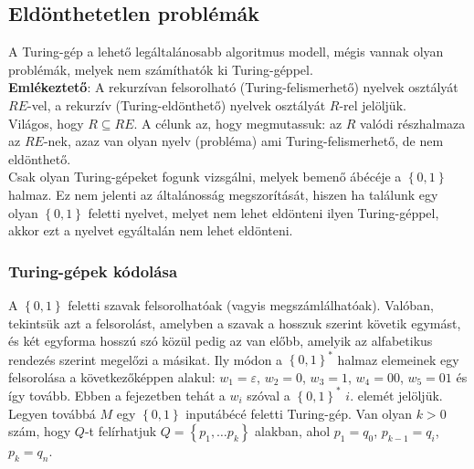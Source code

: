 \documentclass[tikz,12pt,margin=0px]{article}
\begin{document}
	\subsection*{Eldönthetetlen problémák}
	
	\noindent A Turing-gép a lehető legáltalánosabb algoritmus modell, mégis vannak olyan problémák, melyek nem számíthatók ki Turing-géppel.\\
	
	\noindent \textbf{Emlékeztető}: A rekurzívan felsorolható (Turing-felismerhető) nyelvek osztályát $RE$-vel,	a rekurzív (Turing-eldönthető) nyelvek osztályát $R$-rel jelöljük.\\
	
    \noindent Világos, hogy $R \subseteq RE $. A célunk az, hogy megmutassuk: az $R$ valódi részhalmaza az $RE$-nek, azaz van olyan nyelv (probléma) ami	Turing-felismerhető, de nem eldönthető.\\
	
    \noindent Csak olyan Turing-gépeket fogunk vizsgálni, melyek bemenő ábécéje a $\left\{0, 1\right\}$ halmaz. Ez nem jelenti az általánosság megszorítását, hiszen ha	találunk egy olyan $\left\{0, 1\right\}$ feletti nyelvet, melyet nem lehet eldönteni ilyen Turing-géppel, akkor ezt a nyelvet egyáltalán nem lehet eldönteni.\\
	
	\subsubsection*{Turing-gépek kódolása}
	
    A $\left\{0, 1\right\}$ feletti szavak felsorolhatóak (vagyis megszámlálhatóak). Valóban, tekintsük azt a felsorolást, amelyben a szavak a	hosszuk szerint követik egymást, és két egyforma hosszú szó közül pedig az van előbb, amelyik az alfabetikus rendezés szerint megelőzi a másikat. Ily módon a $\left\{0, 1\right\}^{*}$ halmaz elemeinek egy felsorolása a következőképpen alakul: $w_{1} = \varepsilon$, $w_{2} = 0$, $w_{3} = 1$, $w_{4} = 00$, $w_{5} = 01$ és így tovább. Ebben a fejezetben tehát a $w_{i}$ szóval a $\left\{0, 1\right\}^{*}$ $i$. elemét jelöljük.\\
	
    \noindent Legyen továbbá $M$ egy $\left\{0, 1\right\}$ inputábécé feletti Turing-gép. Van olyan $k > 0$ szám, hogy $Q$-t felírhatjuk $Q = \left\{p_{1}, \ldots p_{k}\right\}$ alakban, ahol $p_{1} = q_{0}$, $p_{k-1} = q_{i}$, $p_{k} = q_{n}$.\\
\end{document}
